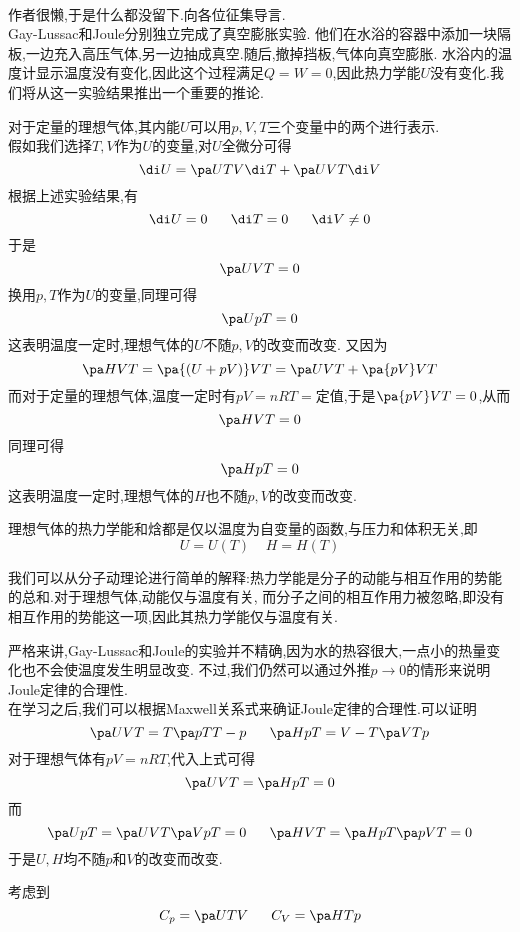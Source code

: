 \documentclass{ctexart}
\begin{document}
\pagestyle{plain}
\noindent{}\vspace{15pt}\\
\indent 作者很懒,于是什么都没留下.向各位征集导言.\vspace{12pt}\\
\indent Gay-Lussac和Joule分别独立完成了真空膨胀实验.%
他们在水浴的容器中添加一块隔板,一边充入高压气体,另一边抽成真空.随后,撤掉挡板,气体向真空膨胀.%
水浴内的温度计显示温度没有变化,因此这个过程满足$Q=W=0$,因此热力学能$U$没有变化.我们将从这一实验结果推出一个重要的推论.
\begin{derivation}
    对于定量的理想气体,其内能$U$可以用$p,V,T$三个变量中的两个进行表示.\\
    假如我们选择$T,V$作为$U$的变量,对$U$全微分可得
    \[\di U=\pa UTV\di T+\pa UVT\di V\]
    根据上述实验结果,有
    \[\di U=0\ \ \ \ \ \di T=0\ \ \ \ \ \di V\neq0\]
    于是
    \[\pa UVT=0\]
    换用$p,T$作为$U$的变量,同理可得
    \[\pa UpT=0\]
    这表明温度一定时,理想气体的$U$不随$p,V$的改变而改变.
    又因为
    \[\pa HVT=\pa{(U+pV)}VT=\pa UVT+\pa{pV}VT\]
    而对于定量的理想气体,温度一定时有$pV=nRT=\text{定值}$,于是$\pa {pV}VT=0$,从而
    \[\pa HVT=0\]
    同理可得
    \[\pa HpT=0\]
    这表明温度一定时,理想气体的$H$也不随$p,V$的改变而改变.
\end{derivation}
\begin{theorem}[2C.1.1 Joule定律]
    理想气体的热力学能和焓都是仅以温度为自变量的函数,与压力和体积无关,即
    \[U=U(T)\ \ \ \ \ H=H(T)\]

\end{theorem}
我们可以从分子动理论进行简单的解释:热力学能是分子的动能与相互作用的势能的总和.对于理想气体,动能仅与温度有关,%
而分子之间的相互作用力被忽略,即没有相互作用的势能这一项,因此其热力学能仅与温度有关.
\begin{hint}
    严格来讲,Gay-Lussac和Joule的实验并不精确,因为水的热容很大,一点小的热量变化也不会使温度发生明显改变.%
    不过,我们仍然可以通过外推$p\to0$的情形来说明Joule定律的合理性.\\
    在学习之后,我们可以根据Maxwell关系式来确证Joule定律的合理性.可以证明
    \[\pa UVT=T\pa pTT-p\ \ \ \ \ \pa HpT=V-T\pa VTp\]
    对于理想气体有$pV=nRT$,代入上式可得
    \[\pa UVT=\pa HpT=0\]
    而
    \[\pa UpT=\pa UVT\pa VpT=0\ \ \ \ \ \pa HVT=\pa HpT\pa pVT=0\]
    于是$U,H$均不随$p$和$V$的改变而改变.
\end{hint}
\indent 考虑到
\[C_p=\pa UTV\ \ \ \ \ C_V=\pa HTp\]
\end{document}
